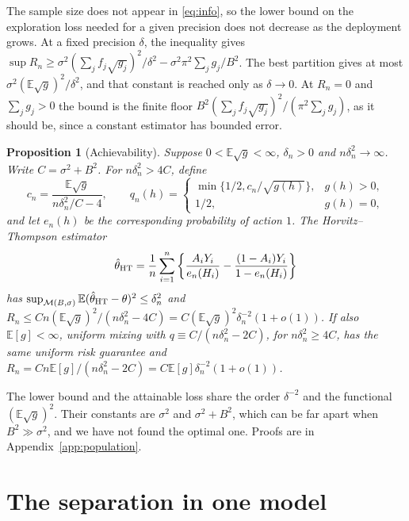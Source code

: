 \documentclass[12pt]{article}
\newtheorem{proposition}{Proposition}
\theoremstyle{definition}
\theoremstyle{remark}
\newcommand{\E}{\mathbb{E}}
\newcommand{\M}{\mathcal{M}}
\begin{document}
The sample size does not appear in \eqref{eq:info}, so the lower bound on the
exploration loss needed for a given precision does not decrease as the deployment
grows. At a fixed precision $\delta$, the
inequality gives
$\sup R_n\ge\sigma^2(\sum_jf_j\sqrt{g_j})^2/\delta^2-\sigma^2\pi^2\sum_jg_j/B^2$.
The best partition gives at most $\sigma^2(\E\sqrt g)^2/\delta^2$, and that constant
is reached only as $\delta\to0$. At $R_n=0$ and $\sum_jg_j>0$ the bound is the finite
floor $B^2(\sum_jf_j\sqrt{g_j})^2/(\pi^2\sum_jg_j)$, as it should be, since a
constant estimator has bounded error.

\begin{proposition}[Achievability]\label{prop:achieve}
Suppose $0<\E\sqrt g<\infty$, $\delta_n>0$ and $n\delta_n^2\to\infty$. Write
$C=\sigma^2+B^2$. For $n\delta_n^2>4C$, define
\begin{equation}\label{eq:allocation}
 c_n=\frac{\E\sqrt g}{n\delta_n^2/C-4},\qquad
 q_n(h)=\begin{cases}
 \min\{1/2,c_n/\sqrt{g(h)}\},&g(h)>0,\\
 1/2,&g(h)=0,
 \end{cases}
\end{equation}
and let $e_n(h)$ be the corresponding probability of action $1$. The
Horvitz--Thompson estimator
\begin{equation}\label{eq:ht}
 \hat\theta_{\rm HT}=\frac1n\sum_{i=1}^n
 \left\{\frac{A_iY_i}{e_n(H_i)}-
 \frac{(1-A_i)Y_i}{1-e_n(H_i)}\right\}
\end{equation}
has $\sup_{\M(B,\sigma)}\E(\hat\theta_{\rm HT}-\theta)^2\le\delta_n^2$ and
$R_n\le Cn(\E\sqrt g)^2/(n\delta_n^2-4C)=C(\E\sqrt g)^2\delta_n^{-2}(1+o(1))$.
If also $\E[g]<\infty$, uniform mixing with $q\equiv C/(n\delta_n^2-2C)$, for
$n\delta_n^2\ge4C$, has the same uniform risk guarantee and
$R_n=Cn\E[g]/(n\delta_n^2-2C)=C\E[g]\delta_n^{-2}(1+o(1))$.
\end{proposition}

The lower bound and the attainable loss share the order $\delta^{-2}$ and the
functional $(\E\sqrt g)^2$. Their constants are $\sigma^2$ and $\sigma^2+B^2$, which
can be far apart when $B^2\gg\sigma^2$, and we have not found the optimal one. Proofs
are in Appendix~\ref{app:population}.

\section{The separation in one model}\label{sec:separation}
\end{document}
